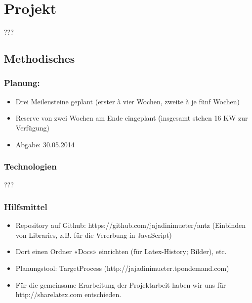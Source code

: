 
\chapter{Projekt}

???

\section{Methodisches}


\subsection*{Planung:}

\begin{itemize}[noitemsep]
\item Drei Meilensteine geplant (erster à vier Wochen, zweite à je fünf Wochen)
\item Reserve von zwei Wochen am Ende eingeplant (insgesamt stehen 16 KW zur Verfügung)
\item Abgabe: 30.05.2014
\end{itemize}


\vspace*{1cm}


\subsection{Technologien}

???


\subsection{Hilfsmittel}

\begin{itemize}[noitemsep]
\item Repository auf Github: https://github.com/jajadinimueter/antz (Einbinden von Libraries, z.B. für die Vererbung in JavaScript)
\item Dort einen Ordner «Docs» einrichten (für Latex-History; Bilder), etc.
\item Planungstool: TargetProcess (http://jajadinimueter.tpondemand.com)
\item Für die gemeinsame Erarbeitung der Projektarbeit haben wir uns für http://sharelatex.com entschieden.
\end{itemize}


\vspace*{1cm}


\cite[S. 115]{ds-ant}

